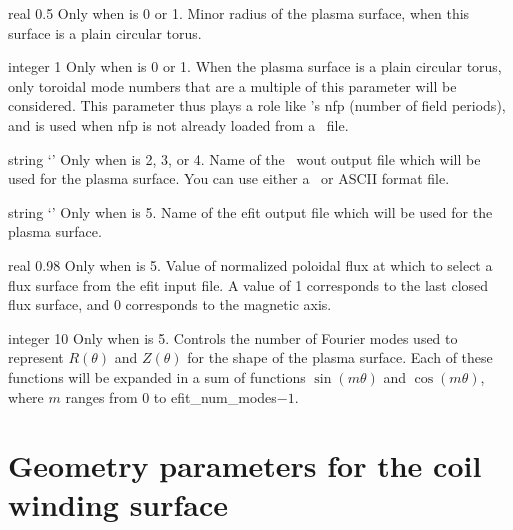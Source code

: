 \myhrule

{real}
{0.5}
{Only when  is 0 or 1.}
{Minor radius of the plasma surface, when this surface is a plain circular torus.}

\myhrule

{integer}
{1}
{Only when  is 0 or 1.}
{When the plasma surface is a plain circular torus, only toroidal mode numbers that are a multiple of this parameter will be considered.
This parameter thus plays a role like \vmec's {\ttfamily nfp} (number of field periods),
and is used when {\ttfamily nfp} is not already loaded from a \vmec~file.}

\myhrule

{string}
{`'}
{Only when  is 2, 3, or 4.}
{Name of the \vmec~{\ttfamily wout} output file which will be used for the plasma surface.
You can use either a \netCDF~or {\ttfamily ASCII} format file.}

\myhrule

{string}
{`'}
{Only when  is 5.}
{Name of the {\ttfamily efit} output file which will be used for the plasma surface.}

\myhrule

{real}
{0.98}
{Only when  is 5.}
{Value of normalized poloidal flux at which to select a flux surface from the {\ttfamily efit} input file.
A value of 1 corresponds to the last closed flux surface, and 0 corresponds to the magnetic axis.}

\myhrule

{integer}
{10}
{Only when  is 5.}
{Controls the number of Fourier modes used to represent $R(\theta)$ and $Z(\theta)$ for the shape of
the plasma surface. Each of these functions will be expanded in a sum of functions $\sin(m\theta)$ and $\cos(m\theta)$,
where $m$ ranges from 0 to {\ttfamily efit\_num\_modes}$-1$.}

\section{Geometry parameters for the coil winding surface}

